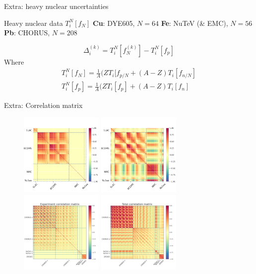 \documentclass{beamer}
\begin{document}
\begin{frame}{Extra: heavy nuclear uncertainties}

\begin{block}{Heavy nuclear data $T_i^N[f_N]$}
{\bf Cu}: DYE605,  $N=64$
\newline
{\bf Fe}: NuTeV (\& EMC), $N=56$
\newline
{\bf Pb}: CHORUS, $N=208$
\end{block}
\begin{equation}
\Delta_i^{(k)} = T_i^{N}[f_{N}^{(k)}] - T_i^{N}[f_{p}]
\end{equation}
Where 
\begin{equation}
\begin{split}
    T_i^N[f_N] = \frac{1}{A} (ZT_i[f_{p/N} + (A-Z)T_i[f_{n/N}] \\
    T_i^N[f_p] = \frac{1}{A} (ZT_i[f_p] +  (A-Z)T_i[f_n]
\end{split}
\end{equation}
\end{frame}
\begin{frame}{Extra: Correlation matrix}
  \begin{figure}
  \centering
    \includegraphics[width=40mm]{nuclear_uncs/covexpdeut.png}
    \includegraphics[width=40mm]{nuclear_uncs/covtotdeut.png}
    \includegraphics[width=40mm]{nuclear_uncs/covexpnuc.png}
    \includegraphics[width=40mm]{nuclear_uncs/covtotnuc.png}
  \end{figure}
  \end{frame}
\end{document}
